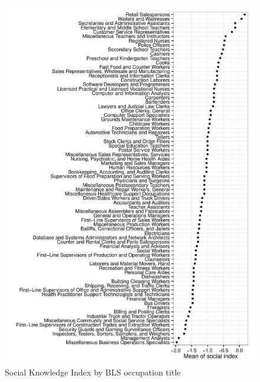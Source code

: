 \documentclass[11pt]{article}
\begin{document}
\begin{figure}
\caption{Social Knowledge Index by BLS occupation title} \label{fig:social_by_occupation}  
\centering
\begin{minipage}{0.85 \linewidth}
\includegraphics[width = \linewidth]{./plots/social_by_occupation.pdf}
\end{minipage}  
\end{figure} 

%
\end{document}
